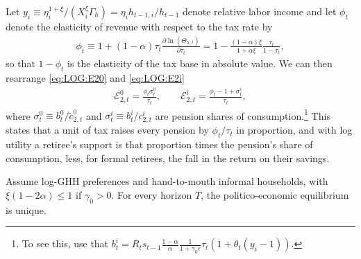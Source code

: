 Let $y_i \equiv \eta_i^{1+\xi}/(X_i^{\xi} \Gamma_h) = \eta_ih_{t-1,i}/h_{t-1}$ denote relative labor income and let $\phi_t$ denote the elasticity of revenue with respect to the tax rate by
\begin{align*}
    \phi_t \equiv 1+(1-\alpha)\tau_t\frac{\partial \ln\left(\Theta_{h,t}\right)}{\partial\tau_t} = 1-\frac{(1-\alpha)\xi}{1+\alpha\xi}\frac{\tau_t}{1-\tau_t},
\end{align*}
so that $1-\phi_t$ is the elasticity of the tax base in absolute value. We can then rearrange \eqref{eq:LOG:E20} and \eqref{eq:LOG:E2i} 
\begin{align}\label{eq:LOG:E2sigma}
    \mathcal{E}_{2,t}^0 = \frac{\phi_t\sigma_t^0}{\tau_t}, \qquad \mathcal{E}_{2,t}^i = \frac{\phi_t-1+\sigma_t^i}{\tau_t},
\end{align}
where $\sigma_t^0 \equiv b_t^0/\tilde{c}_{2,t}^0$ and $\sigma_t^i \equiv b_t^i/c_{2,t}^i$ are pension shares of consumption.\footnote{To see this, use that $b_t^i = R_t s_{t-1} \frac{1-\alpha}{\alpha}\frac{1}{1+\gamma_0\epsilon} \tau_t(1+\theta_t(y_i-1))$.} This states that a unit of tax raises every pension by $\phi_t/\tau_t$ in proportion, and with log utility a retiree's support is that proportion times the pension's share of consumption, less, for formal retirees, the fall in the return on their savings. 



\begin{proposition}\label{prop:PEE:unique}
Assume log-GHH preferences and hand-to-mouth informal households, with $\xi(1-2\alpha) \leq 1$ if $\gamma_0 > 0$. For every horizon $T$, the politico-economic equilibrium is unique.
\end{proposition}

